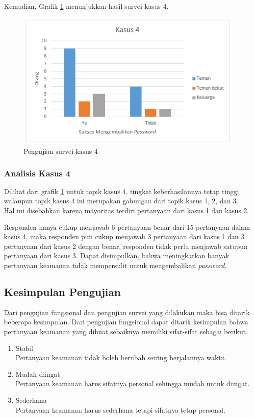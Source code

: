 Kemudian, Grafik \ref{fig:kasus4} menunjukkan hasil survei kasus 4.

\begin{figure}[H]
	\includegraphics[scale=0.8]{Gambar/kasus4}
	\centering
	\caption{Pengujian survei kasus 4}\label{fig:kasus4}
\end{figure}

\subsubsection{Analisis Kasus 4}

Dilihat dari grafik \ref{fig:kasus4} untuk topik kasus 4, tingkat keberhasilannya tetap tinggi walaupun topik kasus 4 ini merupakan gabungan dari topik kasus 1, 2, dan 3. Hal ini disebabkan karena mayoritas terdiri pertanyaan dari kasus 1 dan kasus 2.

Responden hanya cukup menjawab 6 pertanyaan benar dari 15 pertanyaan dalam kasus 4, maka responden pun cukup menjawab 3 pertanyaan dari kasus 1 dan 3 pertanyaan dari kasus 2 dengan benar, responden tidak perlu menjawab satupun pertanyaan dari kasus 3. Dapat disimpulkan, bahwa meningkatkan banyak pertanyaan keamanan tidak mempersulit untuk mengembalikan \textit{password}.

\subsection{Kesimpulan Pengujian}

Dari pengujian fungsional dan pengujian survei yang dilakukan maka bisa ditarik beberapa kesimpulan. Dari pengujian fungsional dapat ditarik kesimpulan bahwa pertanyaan keamanan yang dibuat sebaiknya memiliki sifat-sifat sebagai berikut.
\begin{enumerate}[itemsep=0mm]
	\item Stabil \\
	Pertanyaan keamanan tidak boleh berubah seiring berjalannya waktu.
	\item Mudah diingat \\
	Pertanyaan keamanan harus sifatnya personal sehingga mudah untuk diingat.
	\item Sederhana \\
	Pertanyaan keamanan harus sederhana tetapi sifatnya tetap personal.
\end{enumerate}

